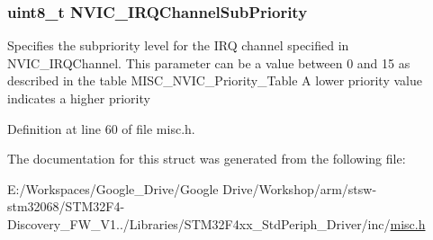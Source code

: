 \hypertarget{struct_n_v_i_c___init_type_def_a91b24559ddbc12752f2414582fb47cb9}{
\subsubsection[{N\-V\-I\-C\-\_\-\-I\-R\-Q\-Channel\-Sub\-Priority}]{\setlength{\rightskip}{0pt plus 5cm}uint8\-\_\-t N\-V\-I\-C\-\_\-\-I\-R\-Q\-Channel\-Sub\-Priority}}\label{struct_n_v_i_c___init_type_def_a91b24559ddbc12752f2414582fb47cb9}
Specifies the subpriority level for the I\-R\-Q channel specified in N\-V\-I\-C\-\_\-\-I\-R\-Q\-Channel. This parameter can be a value between 0 and 15 as described in the table M\-I\-S\-C\-\_\-\-N\-V\-I\-C\-\_\-\-Priority\-\_\-\-Table A lower priority value indicates a higher priority 

Definition at line 60 of file misc.\-h.



The documentation for this struct was generated from the following file\-:\begin{DoxyCompactItemize}
\item 
E\-:/\-Workspaces/\-Google\-\_\-\-Drive/\-Google Drive/\-Workshop/arm/stsw-\/stm32068/\-S\-T\-M32\-F4-\/\-Discovery\-\_\-\-F\-W\-\_\-\-V1../\-Libraries/\-S\-T\-M32\-F4xx\-\_\-\-Std\-Periph\-\_\-\-Driver/inc/\hyperlink{misc_8h}{misc.\-h}\end{DoxyCompactItemize}
